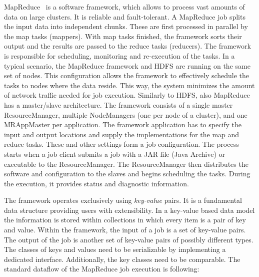 MapReduce~\cite{mapreduce_tutorial} is a software framework, which allows to process vast amounts of data on large clusters. It is reliable and fault-tolerant. A MapReduce job splits the input data into independent chunks. These are first processed in parallel by the map tasks (mappers). With map tasks finished, the framework sorts their output and the results are passed to the reduce tasks (reducers). The framework is responsible for scheduling, monitoring and re-execution of the tasks. In a typical scenario, the MapReduce framework and HDFS are running on the same set of nodes. This configuration allows the framework to effectively schedule the tasks to nodes where the data reside. This way, the system minimizes the amount of network traffic needed for job execution. Similarly to HDFS, also MapReduce has a master/slave architecture. The framework consists of a single master ResourceManager, multiple NodeManagers (one per node of a cluster), and one MRAppMaster per application. The framework application has to specify the input and output locations and supply the implementations for the map and reduce tasks. These and other settings form a job configuration. The process starts when a job client submits a job with a JAR file (Java Archive) or executable to the ResourceManager. The ResourceManager then distributes the software and configuration to the slaves and begins scheduling the tasks. During the execution, it provides status and diagnostic information. 

The framework operates exclusively using \textit{key-value} pairs. It is a fundamental data structure providing users with extensibility. In a key-value based data model the information is stored within collections in which every item is a pair of key and value. Within the framework, the input of a job is a set of key-value pairs. The output of the job is another set of key-value pairs of possibly different types. The classes of keys and values need to be serializable by implementing a dedicated interface. Additionally, the key classes need to be comparable. The standard dataflow of the MapReduce job execution is following:

